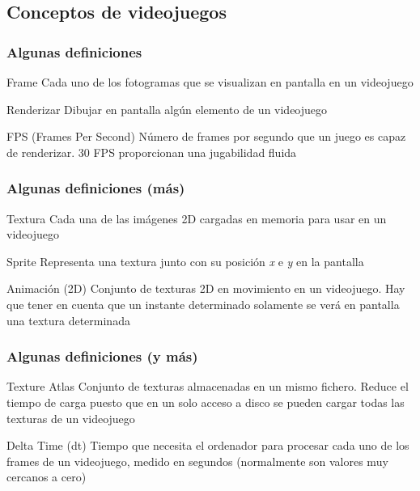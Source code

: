 \documentclass[xcolor={dvipsnames}]{beamer}
\begin{document}
\subsection{Conceptos de videojuegos}
\begin{frame}\frametitle{Algunas definiciones}
	\begin{block}{Frame}
		Cada uno de los fotogramas que se visualizan en pantalla en un videojuego
	\end{block}
	\begin{block}{Renderizar}
		Dibujar en pantalla algún elemento de un videojuego
	\end{block}
	\begin{block}{FPS (Frames Per Second)}
		Número de frames por segundo que un juego es capaz de renderizar. 30 FPS proporcionan una jugabilidad fluida
	\end{block}
\end{frame}

\begin{frame}\frametitle{Algunas definiciones (más)}
	\begin{block}{Textura}
		Cada una de las imágenes 2D cargadas en memoria para usar en un videojuego
	\end{block}
	\begin{block}{Sprite}
		Representa una textura junto con su posición \emph{x} e \emph{y} en la pantalla
	\end{block}
	\begin{block}{Animación (2D)}
		Conjunto de texturas 2D en movimiento en un videojuego. Hay que tener en cuenta que un instante determinado solamente se verá en
        pantalla una textura determinada
	\end{block}
\end{frame}

\begin{frame}\frametitle{Algunas definiciones (y más)}
	\begin{block}{Texture Atlas}
		Conjunto de texturas almacenadas en un mismo fichero. Reduce el tiempo de carga puesto que en un solo acceso a disco se pueden
        cargar todas las texturas de un videojuego
	\end{block}
	\begin{block}{Delta Time (dt)}
		Tiempo que necesita el ordenador para procesar cada uno de los frames de un videojuego, medido en segundos (normalmente son valores 
        muy cercanos a cero)
	\end{block}
\end{frame}
\end{document}
